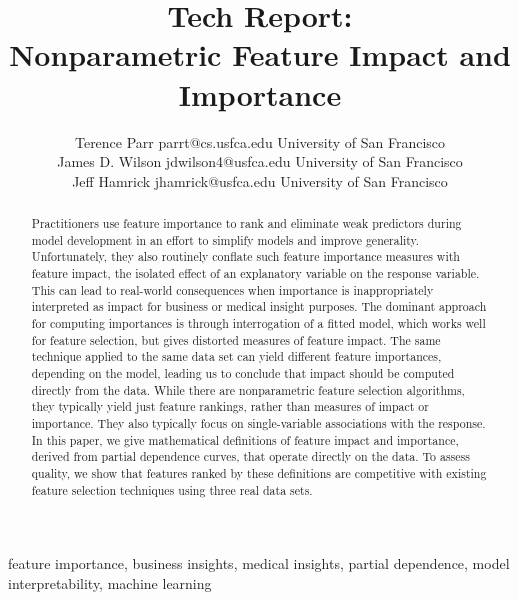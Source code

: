 \documentclass[11pt]{article}
\begin{document}
\def\spacingset#1{\renewcommand{\baselinestretch}%
{#1}\small\normalsize} \spacingset{1}



\title{\bf Tech Report:\\
Nonparametric Feature Impact and Importance}

\author{Terence Parr \email parrt@cs.usfca.edu
\addr University of San Francisco\\
\AND James D. Wilson \email jdwilson4@usfca.edu
\addr University of San Francisco\\
\AND Jeff Hamrick \email jhamrick@usfca.edu
      \addr University of San Francisco}

\maketitle

\begin{abstract}%
Practitioners use feature importance to rank and eliminate weak predictors during model development in an effort to simplify models and improve generality.  Unfortunately, they also routinely conflate such feature importance measures with feature impact, the isolated effect of an explanatory variable on the response variable.   This can lead to real-world consequences when importance is inappropriately interpreted as impact for business or medical insight purposes. The dominant approach for computing importances is through interrogation of a fitted model, which works well for feature selection, but gives distorted measures of feature impact. The same technique applied to the same data set can yield different feature importances, depending on the model, leading us to conclude that impact should be computed directly from the data.  While there are nonparametric feature selection algorithms, they typically yield just feature rankings, rather than measures of impact or importance. They also typically focus on single-variable associations with the response. In this paper, we give mathematical definitions of feature impact and importance, derived from partial dependence curves, that operate directly on the data. To assess quality, we show that features ranked by these definitions are competitive with existing feature selection techniques using three real data sets.
\end{abstract}

\begin{keywords}
feature importance, business insights, medical insights, partial dependence, model interpretability, machine learning
\end{keywords}
\end{document}
